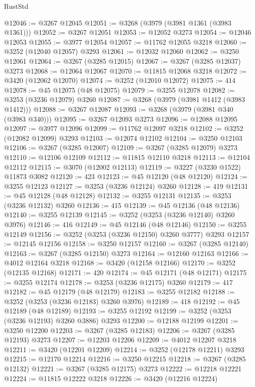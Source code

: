 \begin{lexlean}{RustStd}
\begin{coremodule}
@12046 := @3267 @12045
@12051 := @3268 (@3979 (@3981 @1361 (@3983 @1361)))
@12052 := @3267 @12051
@12053 := @12052 @3273
@12054 := @12046 @12053
@12055 := @3977 @12054
@12057 := @11762 @12055 @3218
@12060 := @3252 (@12040 @12057) @3293
@12061 := @12032 @12060
@12062 := @3250 @12061
@12064 := @3267 (@3285 @12015)
@12067 := @3267 (@3285 @12037) @3273
@12068 := @12064 @12067
@12070 := @11815 @12068 @3218
@12072 := @3420 (@12062 @12070)
@12074 := @3252 (@12010 @12072)
@12075 := 414
@12078 := @45 @12075 (@48 @12075)
@12079 := @3255 @12078
@12082 := @3253 (@3236 @12079) @3260
@12087 := @3268 (@3979 (@3981 @1412 (@3983 @1412)))
@12088 := @3267 @12087
@12093 := @3268 (@3979 (@3981 @340 (@3983 @340)))
@12095 := @3267 @12093 @3273
@12096 := @12088 @12095
@12097 := @3977 @12096
@12099 := @11762 @12097 @3218
@12102 := @3252 (@12082 @12099) @3293
@12103 := @12074 @12102
@12104 := @3250 @12103
@12106 := @3267 (@3285 @12007)
@12109 := @3267 (@3285 @12079) @3273
@12110 := @12106 @12109
@12112 := @11815 @12110 @3218
@12113 := @12104 @12112
@12115 := @3070 (@12002 @12113)
@12119 := @3227 (@3230 @1522) @11873 @3082
@12120 := 423
@12123 := @45 @12120 (@48 @12120)
@12124 := @3255 @12123
@12127 := @3253 (@3236 @12124) @3260
@12128 := 419
@12131 := @45 @12128 (@48 @12128)
@12132 := @3255 @12131
@12135 := @3253 (@3236 @12132) @3260
@12136 := 415
@12139 := @45 @12136 (@48 @12136)
@12140 := @3255 @12139
@12145 := @3252 (@3253 (@3236 @12140) @3260 @3976)
@12146 := 416
@12149 := @45 @12146 (@48 @12146)
@12150 := @3255 @12149
@12156 := @3252 (@3253 (@3236 @12150) @3260 @3777) @3293
@12157 := @12145 @12156
@12158 := @3250 @12157
@12160 := @3267 (@3285 @12140)
@12163 := @3267 (@3285 @12150) @3273
@12164 := @12160 @12163
@12166 := @4012 @12164 @3218
@12168 := @3420 (@12158 @12166)
@12170 := @3252 (@12135 @12168)
@12171 := 420
@12174 := @45 @12171 (@48 @12171)
@12175 := @3255 @12174
@12178 := @3253 (@3236 @12175) @3260
@12179 := 417
@12182 := @45 @12179 (@48 @12179)
@12183 := @3255 @12182
@12188 := @3252 (@3253 (@3236 @12183) @3260 @3976)
@12189 := 418
@12192 := @45 @12189 (@48 @12189)
@12193 := @3255 @12192
@12199 := @3252 (@3253 (@3236 @12193) @3260 @3886) @3293
@12200 := @12188 @12199
@12201 := @3250 @12200
@12203 := @3267 (@3285 @12183)
@12206 := @3267 (@3285 @12193) @3273
@12207 := @12203 @12206
@12209 := @4012 @12207 @3218
@12211 := @3420 (@12201 @12209)
@12214 := @3252 (@12178 @12211) @3293
@12215 := @12170 @12214
@12216 := @3250 @12215
@12218 := @3267 (@3285 @12132)
@12221 := @3267 (@3285 @12175) @3273
@12222 := @12218 @12221
@12224 := @11815 @12222 @3218
@12226 := @3420 (@12216 @12224)

\end{coremodule}
\end{lexlean}
